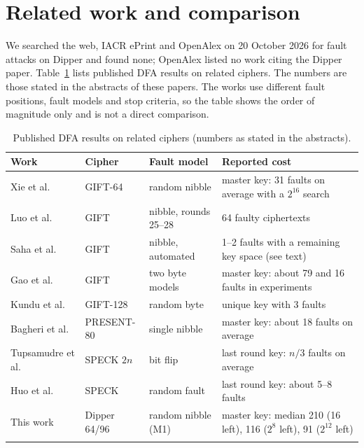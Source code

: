 \documentclass[pdflatex,sn-mathphys-num]{sn-jnl}
\theoremstyle{thmstyleone}%
\theoremstyle{thmstylethree}%
\begin{document}
\section{Related work and comparison}\label{sec:related}

We searched the web, IACR ePrint and OpenAlex on 20 October 2026 for fault attacks on Dipper and found
none; OpenAlex listed no work citing the Dipper paper. Table~\ref{tab:lit} lists published DFA results on
related ciphers. The numbers are those stated in the abstracts of these papers. The works use different
fault positions, fault models and stop criteria, so the table shows the order of magnitude only and is not
a direct comparison.

\begin{table}[t]
\caption{Published DFA results on related ciphers (numbers as stated in the abstracts).}\label{tab:lit}
\begin{tabular*}{\textwidth}{@{\extracolsep\fill}p{2.9cm}p{2.0cm}p{3.0cm}p{4.6cm}@{}}
\toprule
Work & Cipher & Fault model & Reported cost\\
\midrule
Xie et al.~\cite{Xie2021} & GIFT-64 & random nibble & master key: 31 faults on average with a $2^{16}$ search\\
Luo et al.~\cite{Luo2021} & GIFT & nibble, rounds 25--28 & 64 faulty ciphertexts\\
Saha et al.~\cite{Saha2018} & GIFT & nibble, automated & 1--2 faults with a remaining key space (see text)\\
Gao et al.~\cite{Gao2024} & GIFT & two byte models & master key: about 79 and 16 faults in experiments\\
Kundu et al.~\cite{Kundu2025} & GIFT-128 & random byte & unique key with 3 faults\\
Bagheri et al.~\cite{Bagheri2013} & PRESENT-80 & single nibble & master key: about 18 faults on average\\
Tupsamudre et al.~\cite{Tupsamudre2014} & SPECK $2n$ & bit flip & last round key: $n/3$ faults on average\\
Huo et al.~\cite{Huo2015} & SPECK & random fault & last round key: about 5--8 faults\\
\midrule
This work & Dipper 64/96 & random nibble (M1) & master key: median 210 (16 left), 116 ($2^{8}$ left), 91 ($2^{12}$ left)\\
\botrule
\end{tabular*}
\end{table}
\end{document}
